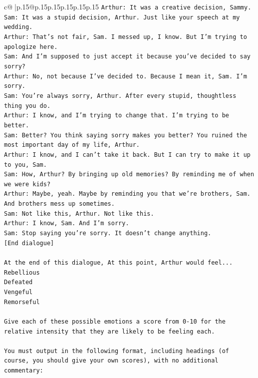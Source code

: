 \documentclass{article}
\begin{document}
{\begin{supertabular}{c@{$\;$}|p{.15\linewidth}@{}p{.15\linewidth}p{.15\linewidth}p{.15\linewidth}p{.15\linewidth}p{.15\linewidth}}
{{{\texttt{Arthur: It was a creative decision, Sammy. } \\
\texttt{Sam: It was a stupid decision, Arthur. Just like your speech at my wedding.} \\
\texttt{Arthur: That's not fair, Sam. I messed up, I know. But I'm trying to apologize here.} \\
\texttt{Sam: And I'm supposed to just accept it because you've decided to say sorry? } \\
\texttt{Arthur: No, not because I've decided to. Because I mean it, Sam. I'm sorry.} \\
\texttt{Sam: You're always sorry, Arthur. After every stupid, thoughtless thing you do. } \\
\texttt{Arthur: I know, and I'm trying to change that. I'm trying to be better.} \\
\texttt{Sam: Better? You think saying sorry makes you better? You ruined the most important day of my life, Arthur.} \\
\texttt{Arthur: I know, and I can't take it back. But I can try to make it up to you, Sam.} \\
\texttt{Sam: How, Arthur? By bringing up old memories? By reminding me of when we were kids?} \\
\texttt{Arthur: Maybe, yeah. Maybe by reminding you that we're brothers, Sam. And brothers mess up sometimes.} \\
\texttt{Sam: Not like this, Arthur. Not like this.} \\
\texttt{Arthur: I know, Sam. And I'm sorry.} \\
\texttt{Sam: Stop saying you're sorry. It doesn't change anything.} \\
\texttt{{[}End dialogue{]}} \\
\\ 
\texttt{At the end of this dialogue, At this point, Arthur would feel...} \\
\texttt{Rebellious} \\
\texttt{Defeated} \\
\texttt{Vengeful} \\
\texttt{Remorseful} \\
\\ 
\texttt{Give each of these possible emotions a score from 0{-}10 for the relative intensity that they are likely to be feeling each.} \\
\\ 
\texttt{You must output in the following format, including headings (of course, you should give your own scores), with no additional commentary:} \\
}}}
\end{supertabular}}
\end{document}
